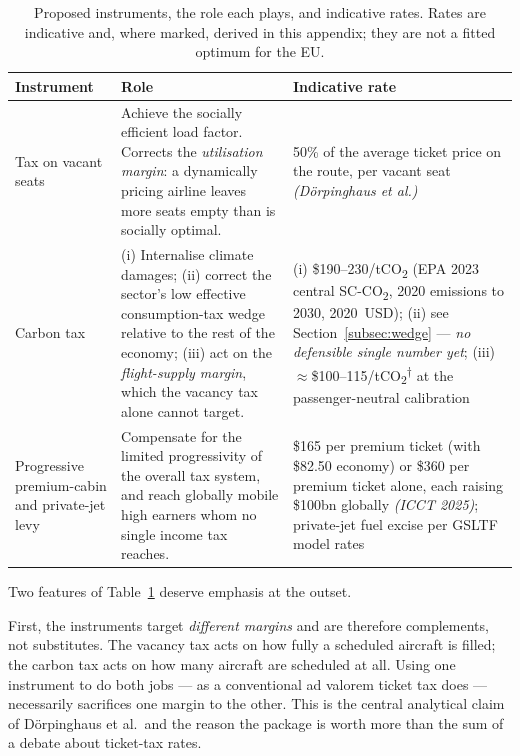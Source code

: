 \documentclass[11pt]{article}
\newcommand{\derived}{\textsuperscript{$\dagger$}}
\begin{document}
\begin{table}[htbp]
\centering
\small
\caption{Proposed instruments, the role each plays, and indicative rates.
Rates are indicative and, where marked, derived in this appendix; they are not
a fitted optimum for the EU.}
\label{tab:instruments}
\begin{tabularx}{\textwidth}{@{}p{3.1cm} X p{4.5cm}@{}}
\toprule
\textbf{Instrument} & \textbf{Role} & \textbf{Indicative rate} \\
\midrule
Tax on vacant seats
& Achieve the socially efficient load factor. Corrects the
\emph{utilisation margin}: a dynamically pricing airline leaves more seats empty
than is socially optimal.
& 50\% of the average ticket price on the route, per vacant seat
\newline \emph{(Dörpinghaus et al.)} \\
\addlinespace
Carbon tax
& (i) Internalise climate damages;
\newline (ii) correct the sector's low effective consumption-tax wedge relative
to the rest of the economy;
\newline (iii) act on the \emph{flight-supply margin}, which the vacancy tax
alone cannot target.
& (i) \$190--230/tCO\textsubscript{2} (EPA 2023 central SC-CO\textsubscript{2},
2020 emissions to 2030, 2020~USD);
\newline (ii) see Section~\ref{subsec:wedge} --- \emph{no defensible single
number yet};
\newline (iii) $\approx$\$100--115/tCO\textsubscript{2}\derived{} at the
passenger-neutral calibration \\
\addlinespace
Progressive premium-cabin and private-jet levy
& Compensate for the limited progressivity of the overall tax system, and reach
globally mobile high earners whom no single income tax reaches.
& \$165 per premium ticket (with \$82.50 economy) or \$360 per premium ticket
alone, each raising \$100bn globally \emph{(ICCT 2025)}; private-jet fuel excise
per GSLTF model rates \\
\bottomrule
\end{tabularx}
\end{table}

Two features of Table~\ref{tab:instruments} deserve emphasis at the outset.

First, the instruments target \emph{different margins} and are therefore
complements, not substitutes. The vacancy tax acts on how fully a scheduled
aircraft is filled; the carbon tax acts on how many aircraft are scheduled at
all. Using one instrument to do both jobs --- as a conventional ad valorem
ticket tax does --- necessarily sacrifices one margin to the other. This is the
central analytical claim of Dörpinghaus et al.\ and the reason the package is
worth more than the sum of a debate about ticket-tax rates.
\end{document}
